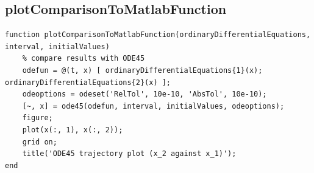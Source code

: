 \subsection{plotComparisonToMatlabFunction}
\begin{simplechar}
\begin{lstlisting}
function plotComparisonToMatlabFunction(ordinaryDifferentialEquations, interval, initialValues)
    % compare results with ODE45
    odefun = @(t, x) [ ordinaryDifferentialEquations{1}(x); ordinaryDifferentialEquations{2}(x) ];
    odeoptions = odeset('RelTol', 10e-10, 'AbsTol', 10e-10);
    [~, x] = ode45(odefun, interval, initialValues, odeoptions);
    figure;
    plot(x(:, 1), x(:, 2));
    grid on;
    title('ODE45 trajectory plot (x_2 against x_1)');
end
\end{lstlisting}
\end{simplechar}

